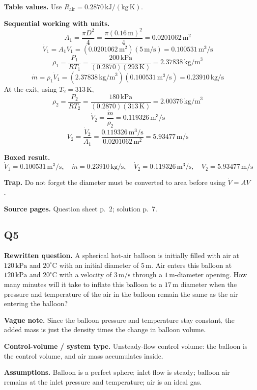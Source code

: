 \textbf{Table values.} Use $R_{\text{air}}=0.2870\,\mathrm{kJ/(kg\,K)}$.

\textbf{Sequential working with units.}
\[
A_1=\frac{\pi D^2}{4}=\frac{\pi(0.16\,\text{m})^2}{4}=0.0201062\,\text{m}^2
\]
\[
\dot V_1=A_1V_1=(0.0201062\,\text{m}^2)(5\,\text{m/s})=0.100531\,\text{m}^3/\text{s}
\]
\[
\rho_1=\frac{P_1}{RT_1}=\frac{200\,\text{kPa}}{(0.2870)(293\,\text{K})}=2.37838\,\text{kg/m}^3
\]
\[
\dot m=\rho_1\dot V_1=(2.37838\,\text{kg/m}^3)(0.100531\,\text{m}^3/\text{s})=0.23910\,\text{kg/s}
\]
At the exit, using $T_2=313\,\text{K}$,
\[
\rho_2=\frac{P_2}{RT_2}=\frac{180\,\text{kPa}}{(0.2870)(313\,\text{K})}=2.00376\,\text{kg/m}^3
\]
\[
\dot V_2=\frac{\dot m}{\rho_2}=0.119326\,\text{m}^3/\text{s}
\]
\[
V_2=\frac{\dot V_2}{A_1}=\frac{0.119326\,\text{m}^3/\text{s}}{0.0201062\,\text{m}^2}=5.93477\,\text{m/s}
\]

\textbf{Boxed result.}
\[
\boxed{\dot V_1 = 0.100531\,\text{m}^3/\text{s},\quad \dot m = 0.23910\,\text{kg/s},\quad \dot V_2 = 0.119326\,\text{m}^3/\text{s},\quad V_2 = 5.93477\,\text{m/s}}
\]

\textbf{Trap.} Do not forget the diameter must be converted to area before using $\dot V=AV$.

\textbf{Source pages.} Question sheet p.~2; solution p.~7.

\subsection*{Q5}
\textbf{Rewritten question.} A spherical hot-air balloon is initially filled with air at $120\,\text{kPa}$ and $20^\circ\text{C}$ with an initial diameter of $5\,\text{m}$. Air enters this balloon at $120\,\text{kPa}$ and $20^\circ\text{C}$ with a velocity of $3\,\text{m/s}$ through a $1\,\text{m}$-diameter opening. How many minutes will it take to inflate this balloon to a $17\,\text{m}$ diameter when the pressure and temperature of the air in the balloon remain the same as the air entering the balloon?

\textbf{Vague note.} Since the balloon pressure and temperature stay constant, the added mass is just the density times the change in balloon volume.

\textbf{Control-volume / system type.} Unsteady-flow control volume: the balloon is the control volume, and air mass accumulates inside.

\textbf{Assumptions.} Balloon is a perfect sphere; inlet flow is steady; balloon air remains at the inlet pressure and temperature; air is an ideal gas.

